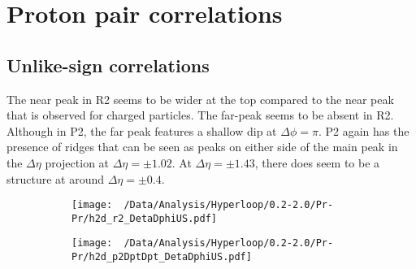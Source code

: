 \documentclass[12pt,a4paper,twoside]{report}
\begin{document}
\section{Proton pair correlations}
\subsection{Unlike-sign correlations}
The near peak in R2 seems to be wider at the top compared to the near peak that is observed for charged particles. The far-peak seems to be absent in R2. Although in P2, the far peak features a shallow dip at $\Delta\phi=\pi$.
P2 again has the presence of ridges that can be seen as peaks on either side of the main peak in the $\Delta\eta$ projection at $\Delta\eta=\pm1.02$. At $\Delta\eta=\pm1.43$, there does seem to be a structure at around $\Delta\eta=\pm0.4$.
\begin{figure}[H]
	\begin{subfigure}{0.49\linewidth}
		\texttt{[image: ~/Data/Analysis/Hyperloop/0.2-2.0/Pr-Pr/h2d\_r2\_DetaDphiUS.pdf]}\\
	\end{subfigure}
	\begin{subfigure}{0.49\linewidth}
		\texttt{[image: ~/Data/Analysis/Hyperloop/0.2-2.0/Pr-Pr/h2d\_p2DptDpt\_DetaDphiUS.pdf]}\\
	\end{subfigure}
\end{figure}
\end{document}
